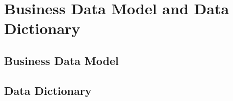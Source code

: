 \section{Business Data Model and Data Dictionary}
\subsection{Business Data Model}
\subsection{Data Dictionary}